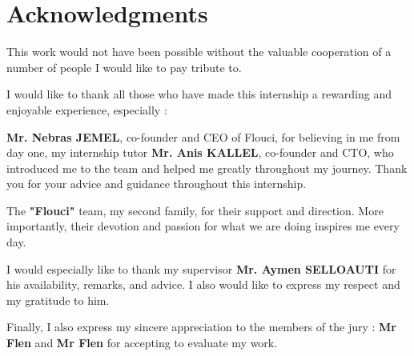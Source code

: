 \chapter*{Acknowledgments}

This work would not have been possible without the valuable cooperation of a number of people I would like to pay tribute to.\newline

I would like to thank all those who have made this internship a rewarding and enjoyable experience, especially :\newline

\textbf{Mr. Nebras JEMEL}, co-founder and CEO of Flouci, for believing in me from day one, my internship tutor \textbf{Mr. Anis KALLEL}, co-founder and CTO, who introduced me to the team and helped me greatly throughout my journey. Thank you for your advice and guidance throughout this internship. \newline

The \textbf{"Flouci"} team, my second family, for their support and direction. More importantly, their devotion and passion for what we are doing inspires me every day.\newline

I would especially like to thank my supervisor \textbf{Mr. Aymen SELLOAUTI} for his availability, remarks, and advice. I also would like to express my respect and my gratitude to him.\newline

Finally, I also express my sincere appreciation to the members of the jury : \textbf{Mr Flen} and \textbf{Mr Flen} for accepting to evaluate my work.
